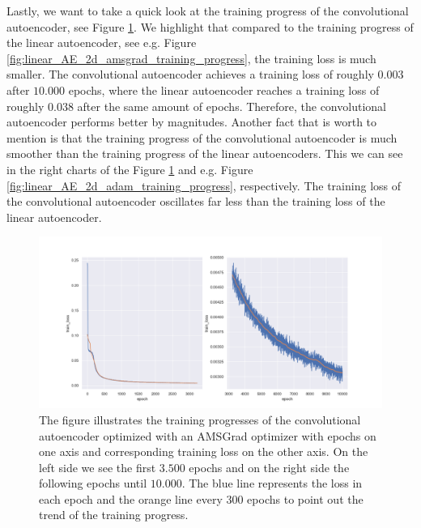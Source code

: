 Lastly, we want to take a quick look at the training progress of the convolutional autoencoder, see Figure \ref{fig:convolutional_AE_training_progress}. We highlight that compared to the training progress of the linear autoencoder, see e.g. Figure \ref{fig:linear_AE_2d_amsgrad_training_progress}, the training loss is much smaller. The convolutional autoencoder achieves a training loss of roughly $0.003$ after $10.000$ epochs, where the linear autoencoder reaches a training loss of roughly $0.038$ after the same amount of epochs. Therefore, the convolutional autoencoder performs better by magnitudes. Another fact that is worth to mention is that the training progress of the convolutional autoencoder is much smoother than the training progress of the linear autoencoders. This we can see in the right charts of the Figure \ref{fig:convolutional_AE_training_progress} and e.g. Figure \ref{fig:linear_AE_2d_adam_training_progress}, respectively. The training loss of the convolutional autoencoder oscillates far less than the training loss of the linear autoencoder.

\begin{figure}
\begin{center}
\includegraphics[width=\linewidth]{convolutional_AE_training_progress}
\end{center}
\caption{The figure illustrates the training progresses of the convolutional autoencoder optimized with an AMSGrad optimizer  with epochs on one axis and corresponding training loss on the other axis. On the left side we see the first $3.500$ epochs and on the right side the following epochs until $10.000$. The blue line represents the loss in each epoch and the orange line every $300$ epochs to point out the trend of the training progress.}\label{fig:convolutional_AE_training_progress}
\end{figure}
